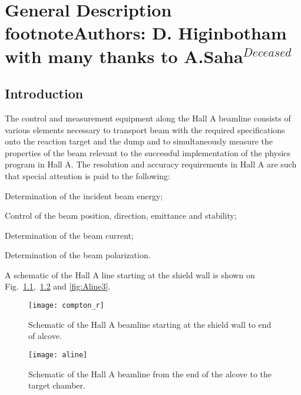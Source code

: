 \chapter[General Description]{General Description
footnote{Authors: D. Higinbotham  with many thanks to A.Saha$^{Deceased}$}}
\section{Introduction}
\label{sec:beam-intro}

The control and measurement equipment along the Hall A beamline consists of 
various elements necessary to transport beam with the required specifications 
onto the reaction target and the dump and to simultaneously measure the 
properties of the beam relevant to the successful implementation of the 
physics program in Hall A.  The resolution and accuracy requirements in Hall 
A are such that special attention is paid to the following:
\begin{list}{.~}{\setlength{\itemsep}{-0.15cm}}
  \item Determination of the incident beam energy;
  \item Control of the beam position, direction, emittance and stability;
  \item Determination of the beam current;
  \item Determination of the beam polarization.
\end{list}

A schematic of the Hall A line starting at the shield wall is
shown on Fig.~\ref{fig:Aline1},~\ref{fig:Aline2} and \ref{fig:Aline3}. 

\begin{figure}
\begin{center}
\texttt{[image: compton\_r]}
\caption[Beamline: Hall A Beamline Overview]{Schematic of the Hall A beamline
starting at the shield wall to end of alcove.}
\label{fig:Aline1}
\end{center}
\end{figure}

\begin{figure}
\begin{center}
\texttt{[image: aline]}
\caption[Beamline: Hall A Beamline Overview]{Schematic of the Hall A beamline
from the end of the alcove to the target chamber.}
\label{fig:Aline2}
\end{center}
\end{figure}


